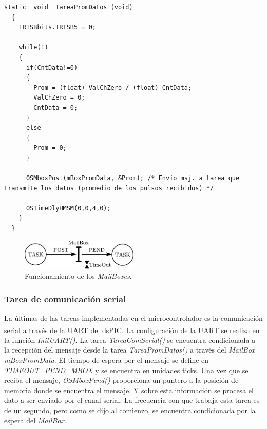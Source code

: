 \documentclass[11pt,a4paper,oneside]{article}
\begin{document}
\begin{lstlisting}[caption={Función de la tarea \emph{TareaPromDatos()}},label=code:func-tareaprom]
  static  void  TareaPromDatos (void)
  {
    TRISBbits.TRISB5 = 0;
    
    while(1)
    {
      if(CntData!=0)
      {
        Prom = (float) ValChZero / (float) CntData;
        ValChZero = 0;
        CntData = 0;
      }
      else
      {
        Prom = 0;
      }
      
      OSMboxPost(mBoxPromData, &Prom); /* Envío msj. a tarea que transmite los datos (promedio de los pulsos recibidos) */

      OSTimeDlyHMSM(0,0,4,0);
    }
  }
\end{lstlisting}

\begin{figure}[h]
  \centering
  \includegraphics[width=0.5\textwidth]{images/mailbox}
  \caption{Funcionamiento de los \emph{MailBoxes}.}
  \label{fig:mailbox}
\end{figure}

\subsubsection{Tarea de comunicación serial}
\label{sec:tarea-com-serial}

La últimas de las tareas implementadas en el microcontrolador es la comunicación serial a través de la UART del dsPIC\textsuperscript{\textregistered}. La configuración de la UART se realiza en la función \emph{InitUART()}. La tarea \emph{TareaComSerial()} se encuentra condicionada a la recepción del mensaje desde la tarea \emph{TareaPromDatos()} a través del \emph{MailBox mBoxPromData}. El tiempo de espera por el mensaje se define en \emph{TIMEOUT\_PEND\_MBOX} y se encuentra en unidades ticks. Una vez que se reciba el mensaje, \emph{OSMboxPend()} proporciona un puntero a la posición de memoria donde se encuentra el mensaje. Y sobre esta información se procesa el dato a ser enviado por el canal serial. La frecuencia con que trabaja esta tarea es de un segundo, pero como se dijo al comienzo, se encuentra condicionada por la espera del \emph{MailBox}.
\end{document}
